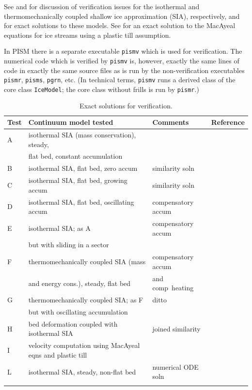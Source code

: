 \documentclass[11pt,final]{amsart}
\begin{document}
See \cite{BLKCB} and \cite{BBL} for discussion of verification issues for the isothermal and thermomechanically coupled shallow ice approximation (SIA), respectively, and for exact solutions to these models.  See \cite{SchoofStream} for an exact solution to the MacAyeal equations for ice streams using a plastic till assumption.

In PISM there is a separate executable \verb|pismv| which is used for verification.  The numerical code which is verified by \verb|pismv| is, however, exactly the same lines of code in exactly the same source files as is run by the non-verification executables \verb|pismr|, \verb|pisms|, \verb|pgrn|, etc.  (In technical terms, \verb|pismv| runs a derived class of the core class \verb|IceModel|; the core class without frills is run by \verb|pismr|.)

\begin{table}[h]
\caption{Exact solutions for verification.}\label{tab:tests}
\small
\begin{tabular}{@{}llll}\hline
\textbf{Test} & \textbf{Continuum model tested} & \textbf{Comments} & \textbf{Reference} \\ \hline
A & isothermal SIA (mass conservation), steady, &  & \cite{BLKCB} \\
 & flat bed, constant accumulation &  &  \\
B & isothermal SIA, flat bed, zero accum & similarity soln & \cite{BLKCB} \\
C & isothermal SIA, flat bed, growing accum & similarity soln & \cite{BLKCB} \\
D & isothermal SIA, flat bed, oscillating accum & compensatory accum & \cite{BLKCB} \\
E & isothermal SIA; as A &  compensatory accum & \cite{BLKCB} \\
 & but with sliding in a sector &  &  \\
F & thermomechanically coupled SIA (mass &  compensatory accum & \cite{BB,BBL} \\
 & and energy cons.), steady, flat bed & and comp~heating &  \\
G & thermomechanically coupled SIA; as F  & ditto & \cite{BB,BBL} \\
 & but with oscillating accumulation &  &  \\
H & bed deformation coupled with isothermal SIA & joined similarity & \cite{BLKfastearth} \\
I & velocity computation using MacAyeal eqns and plastic till &  & \cite{MacAyeal,SchoofStream} \\
L & isothermal SIA, steady, non-flat bed & numerical ODE soln & \cite{BuelerEquilSheets} \\
\hline
\normalsize
\end{tabular}
\end{table}
\end{document}
